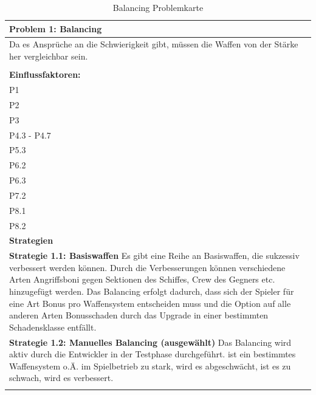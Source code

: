 \documentclass[fontsize=12pt,paper=a4,twoside]{scrartcl}
\begin{document}
\begin{table}[H]
    \centering
    \begin{tabular}{|p{15cm}|}
    \hline
          \textbf{Problem 1: Balancing}  \\ \hline
	Da es Ansprüche an die Schwierigkeit gibt, müssen die Waffen von der Stärke her vergleichbar sein. \\
         \\ \hline
          \textbf{Einflussfaktoren: } \\
	P1 \\
	P2 \\
	P3 \\
	P4.3 - P4.7 \\
	P5.3 \\
	P6.2 \\
	P6.3 \\
	P7.2 \\
	P8.1 \\
	P8.2 \\
          \hline
          \textbf{Strategien} \\ \hline
            {}          
           \label{strategie:1.1}     
          \textbf{Strategie 1.1: Basiswaffen} Es gibt eine Reihe an Basiswaffen, die sukzessiv verbessert werden können. Durch die Verbesserungen können verschiedene Arten Angriffsboni gegen Sektionen des Schiffes, Crew des Gegners etc. hinzugefügt werden. Das Balancing erfolgt dadurch, dass sich der Spieler für eine Art Bonus pro Waffensystem entscheiden muss und die Option auf alle anderen Arten Bonusschaden durch das Upgrade in einer bestimmten Schadensklasse entfällt. \\        
  {}          
           \label{strategie:1.2}              
          \textbf{Strategie 1.2: Manuelles Balancing (ausgewählt)} Das Balancing wird aktiv durch die Entwickler in der Testphase durchgeführt. ist ein bestimmtes Waffensystem o.Ä. im Spielbetrieb zu stark, wird es abgeschwächt, ist es zu schwach, wird es verbessert.  \\
	 \\ \hline
    \end{tabular}

    \caption{Balancing Problemkarte}
    \label{tab:ProblemKarte1}
\end{table}
\end{document}
